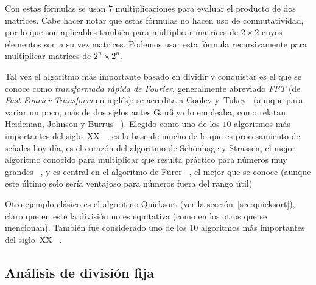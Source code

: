   Con estas fórmulas se usan \(7\) multiplicaciones
  para evaluar el producto de dos matrices.
  Cabe hacer notar que estas fórmulas
  no hacen uso de conmutatividad,
  por lo que son aplicables también
  para multiplicar matrices de \(2 \times 2\)
  cuyos elementos son a su vez matrices.
  Podemos usar esta fórmula recursivamente
  para multiplicar matrices de \(2^n \times 2^n\).

  Tal vez el algoritmo más importante
  basado en dividir y conquistar
  es el que se conoce
  como \emph{transformada rápida de Fourier},%
  generalmente abreviado \emph{FFT}
  (de \emph{\foreignlanguage{english}{Fast Fourier Transform}} en inglés);
  se acredita a Cooley y~Tukey~%
    \cite{cooley65:_FFT}
  (aunque para variar un poco,
   más de dos siglos antes Gauß%
   ya lo empleaba,
   como relatan Heideman, Johnson y Burrus~%
     \cite{heideman84:_gauss_history_FFT}).
  Elegido
  como uno de los \(10\) algoritmos más importantes del siglo~XX~%
    \cite{dongarra00:_top10_algorithms},
  es la base de mucho de lo que es procesamiento de señales hoy día,
  es el corazón del algoritmo de Schönhage y Strassen,%
  el mejor algoritmo conocido para multiplicar que resulta práctico
  para números muy grandes~%
    \cite{schoehage71:_schnel_multip_zahlen},
  y es central en el algoritmo de Fürer~%
    \cite{fuerer07:_faster_integ_multip},
  el mejor que se conoce
  (aunque este último solo sería ventajoso
   para números fuera del rango útil)

  Otro ejemplo clásico es el algoritmo Quicksort%
  (ver la sección~\ref{sec:quicksort}),
  claro que en este la división no es equitativa
  (como en los otros que se mencionan).
  También fue considerado
  uno de los \(10\) algoritmos más importantes del siglo~XX~%
    \cite{dongarra00:_top10_algorithms}.

\subsection{Análisis de división fija}
\label{sec:d&c:division-fija}

